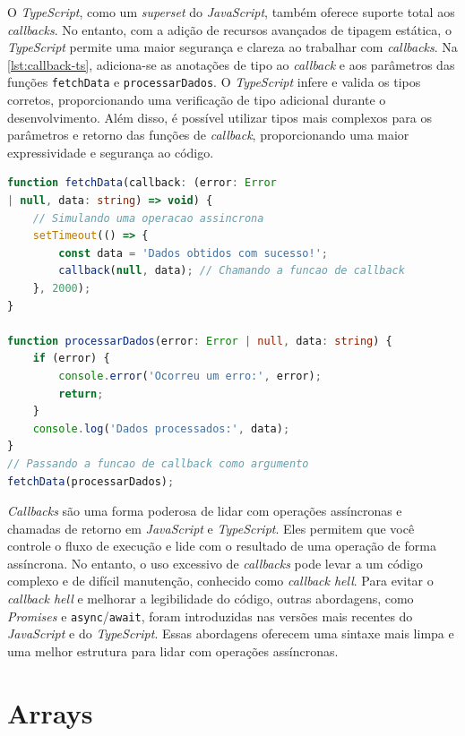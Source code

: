 O \textit{TypeScript}, como um \textit{superset} do \textit{JavaScript}, também oferece suporte total aos \textit{callbacks}. No entanto, com a adição de recursos avançados de tipagem estática, o \textit{TypeScript} permite uma maior segurança e clareza ao trabalhar com \textit{callbacks}. Na \autoref{lst:callback-ts}, adiciona-se as anotações de tipo ao \textit{callback} e aos parâmetros das funções \texttt{fetchData} e \texttt{processarDados}. O \textit{TypeScript} infere e valida os tipos corretos, proporcionando uma verificação de tipo adicional durante o desenvolvimento. Além disso, é possível utilizar tipos mais complexos para os parâmetros e retorno das funções de \textit{callback}, proporcionando uma maior expressividade e segurança ao código.


\begin{lstlisting}[language=TypeScript, caption={Exemplo de uso de \textit{callback} em \textit{TypeScript}}, label=lst:callback-ts]
function fetchData(callback: (error: Error 
| null, data: string) => void) {
    // Simulando uma operacao assincrona
    setTimeout(() => {
        const data = 'Dados obtidos com sucesso!';
        callback(null, data); // Chamando a funcao de callback
    }, 2000);
}

function processarDados(error: Error | null, data: string) {
    if (error) {
        console.error('Ocorreu um erro:', error);
        return;
    }
    console.log('Dados processados:', data);
}
// Passando a funcao de callback como argumento
fetchData(processarDados);
\end{lstlisting}


\textit{Callbacks} são uma forma poderosa de lidar com operações assíncronas e chamadas de retorno em \textit{JavaScript} e \textit{TypeScript}. Eles permitem que você controle o fluxo de execução e lide com o resultado de uma operação de forma assíncrona. No entanto, o uso excessivo de \textit{callbacks} pode levar a um código complexo e de difícil manutenção, conhecido como \textit{callback hell}. Para evitar o \textit{callback hell} e melhorar a legibilidade do código, outras abordagens, como \textit{Promises} e \texttt{async}/\texttt{await}, foram introduzidas nas versões mais recentes do \textit{JavaScript} e do \textit{TypeScript}. Essas abordagens oferecem uma sintaxe mais limpa e uma melhor estrutura para lidar com operações assíncronas.

\section{Arrays}
\label{JS_arays}

